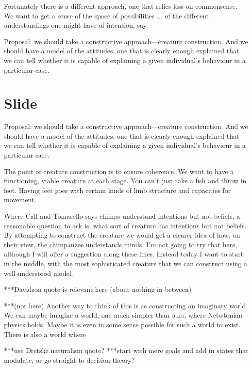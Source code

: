 \documentclass[12pt,\papersize]{extarticle}
\begin{document}
Fortunately there is a different approach, one that relies less on commonsense.
We want to get a sense of the space of possibilities ... of the different understandings one might have of intention, say.

Proposal: we should take a constructive approach---creature construction.
And we should have a model of the attitudes, one that is clearly enough explained that we can tell whether it is capable of explaining a given individual’s behaviour in a particular case.


\section{Slide}
Proposal: we should take a constructive approach---creature construction.
And we should have a model of the attitudes, one that is clearly enough explained that we can tell whether it is capable of explaining a given individual’s behaviour in a particular case.

The point of creature construction is to ensure coherence.  We want to have a functioning, viable creature at each stage.  You can’t just take a fish and throw in feet.  Having feet goes with certain kinds of limb structure and capacities for movement.

Where Call and Tomasello says chimps understand intentions but not beliefs, a reasonable question to ask is, what sort of creature has intentions but not beliefs.  By attempting to construct the creature we would get a clearer idea of how, on their view, the chimpanzee understands minds.  I’m not going to try that here, although I will offer a suggestion along these lines.  Instead today I want to start in the middle, with the most sophisticated creature that we can construct using a well-understood model.

***Davidson quote is relevant here (about nothing in between)

***(not here) Another way to think of this is as constructing an imaginary world.  We can maybe imagine a world, one much simpler than ours, where Netwtonian physics holds.  Maybe it is even in some sense possible for such a world to exist.  There is also a world where 

***use Dretske naturalism quote?
***start with mere goals and add in states that modulate, or go straight to decision theory?
\end{document}
